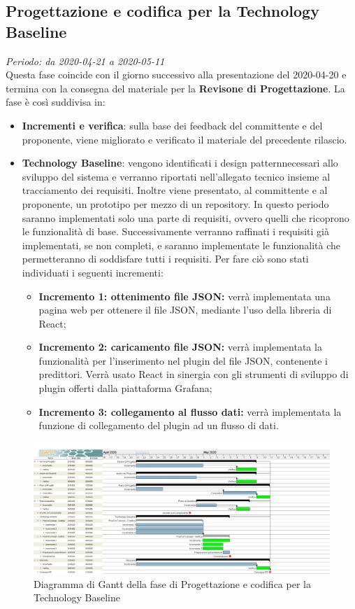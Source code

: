 \subsection{Progettazione e codifica per la Technology Baseline}
\textit{Periodo: da 2020-04-21 a 2020-05-11}\\
Questa fase coincide con il giorno successivo alla presentazione del 2020-04-20 e termina con la consegna del materiale per la \textbf{Revisone di Progettazione}. La fase è così suddivisa in:
\begin{itemize}
\item \textbf{Incrementi e verifica}: sulla base dei feedback del committente e del proponente, viene migliorato e verificato il materiale del precedente rilascio.
\item \textbf{Technology Baseline}: vengono identificati i design pattern\glo necessari allo sviluppo del sistema e verranno riportati nell'allegato tecnico insieme al tracciamento dei requisiti. Inoltre viene presentato, al committente e al proponente, un prototipo per mezzo di un repository\glo. In questo periodo saranno implementati solo una parte di requisiti, ovvero quelli che ricoprono le funzionalità di base. Successivamente verranno raffinati i requisiti già implementati, se non completi, e saranno implementate le funzionalità che permetteranno di soddisfare tutti i requisiti. Per fare ciò sono stati individuati i seguenti incrementi:
	\begin{itemize}
		\item \textbf{Incremento 1: ottenimento file JSON:} verrà implementata una pagina web per ottenere il file JSON, mediante l'uso della libreria di React;
		\item \textbf{Incremento 2: caricamento file JSON:} verrà implementata la funzionalità per l'inserimento nel plugin del file JSON, contenente i predittori. Verrà usato React in sinergia con gli strumenti di sviluppo di plugin offerti dalla piattaforma Grafana;
		\item \textbf{Incremento 3: collegamento al flusso dati:} verrà implementata la funzione di collegamento del plugin ad un flusso di dati.
	\end{itemize}
\end{itemize}

\begin{figure}[H]
\centering
\includegraphics[scale=0.24]{./img/gantt/progettazione_architetturale.png}
\caption{Diagramma di Gantt della fase di Progettazione e codifica per la Technology Baseline}
\end{figure}


